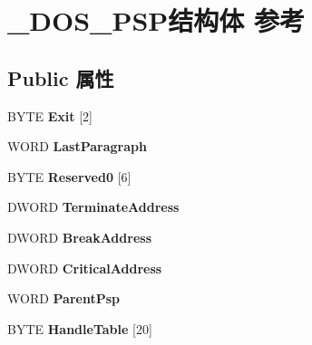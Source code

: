 \hypertarget{struct___d_o_s___p_s_p}{}\section{\+\_\+\+D\+O\+S\+\_\+\+P\+S\+P结构体 参考}
\label{struct___d_o_s___p_s_p}
\subsection*{Public 属性}
\begin{DoxyCompactItemize}
\item 
\mbox{\label{struct___d_o_s___p_s_p_a9d5757b3f707d3ac017ed93299bcd815}} 
B\+Y\+TE {\bfseries Exit} \mbox{[}2\mbox{]}
\item 
\mbox{\label{struct___d_o_s___p_s_p_a44840fd58ec7f9c411968a3c7f6a8b56}} 
W\+O\+RD {\bfseries Last\+Paragraph}
\item 
\mbox{\label{struct___d_o_s___p_s_p_a7cce2b5f9ab0dac0f3aa0665b8e01d9e}} 
B\+Y\+TE {\bfseries Reserved0} \mbox{[}6\mbox{]}
\item 
\mbox{\label{struct___d_o_s___p_s_p_a352f6c0b5ba5ff61dc3204270312426c}} 
D\+W\+O\+RD {\bfseries Terminate\+Address}
\item 
\mbox{\label{struct___d_o_s___p_s_p_a79944304aaf382283ab9035839a64586}} 
D\+W\+O\+RD {\bfseries Break\+Address}
\item 
\mbox{\label{struct___d_o_s___p_s_p_a00f9cf6d810daf30a022602b3fd55ce8}} 
D\+W\+O\+RD {\bfseries Critical\+Address}
\item 
\mbox{\label{struct___d_o_s___p_s_p_a754f0299a620e1ca28d788c690762b5f}} 
W\+O\+RD {\bfseries Parent\+Psp}
\item 
\mbox{\label{struct___d_o_s___p_s_p_a0661aa37a0d44268b5a4db34ddb5d67b}} 
B\+Y\+TE {\bfseries Handle\+Table} \mbox{[}20\mbox{]}
\item 
\mbox{\label{struct___d_o_s___p_s_p_a585efff21c8777bdc6525030c5fa12ae}} 

\end{DoxyCompactItemize}
